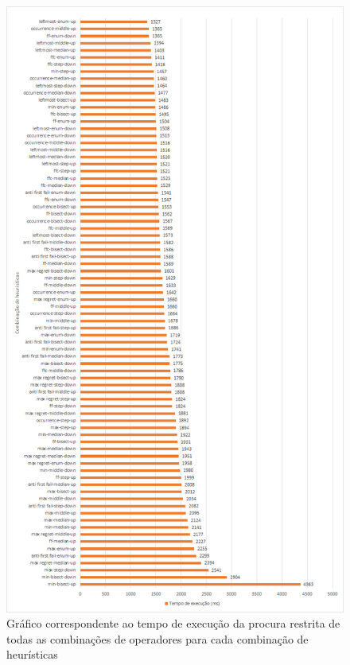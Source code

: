 \begin{figure}[!h]
\includegraphics[width=\textwidth]{images/heuristics_ops.png}
\caption{Gráfico correspondente ao tempo de execução da procura restrita de todas as combinações de operadores para cada combinação de heurísticas} \label{fig:tempo_execucao_combinacoes_heuristicas_operadores}
\end{figure}


